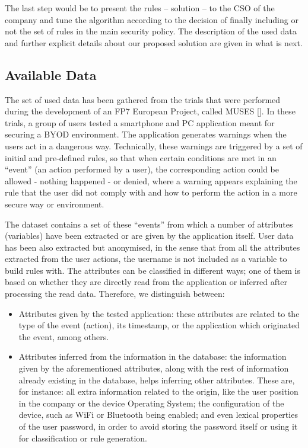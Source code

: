 The last step would be to present the rules -- solution -- to the CSO of the company and tune the algorithm according to the decision of
finally including or not the set of rules in the main security
policy. The description of the used data and further explicit details
about our proposed solution are given in what is next.

\subsection{Available Data}
\label{subsec:data}

 The set of used data has been gathered from the trials that were performed
 during the development of an FP7 European Project, called MUSES
 [\cite{DBLP:conf/sac/MoraCGZJEBAH14}]. In these trials, a group of
 users tested a smartphone and PC application meant for securing a
 BYOD environment. The application generates warnings when the users
 act in a dangerous way. Technically, these warnings are triggered by
 a set of initial and pre-defined rules, so that when certain
 conditions are met in an ``event'' (an action performed by a user),
 the corresponding action could be allowed - nothing happened - or
 denied, where a warning appears explaining the rule that the user did not comply with and how to perform the action in a more secure way or environment.

The dataset contains a set of these ``events'' from which a number of attributes (variables) have been extracted or are given by the application itself. User data has been also extracted but anonymised, in the sense that from all the attributes extracted from the user actions, the username is not included as a variable to build rules with. The attributes can be classified in different ways; one of them is based on whether they are directly read from the application or inferred after processing the read data. Therefore, we distinguish between:
\begin{itemize}
  \item Attributes given by the tested application: these attributes
    are related to the type of the event (action), its timestamp, or
    the application which originated the event, among others. 
  \item Attributes inferred from the information in the database: the information given by the aforementioned attributes, along with the rest of information already existing in the database, helps inferring other attributes. These are, for instance: all extra information related to the origin, like the user position in the company or the device Operating System; the configuration of the device, such as WiFi or Bluetooth being enabled; and even lexical properties of the user password, in order to avoid storing the password itself or using it for classification or rule generation.
\end{itemize}

